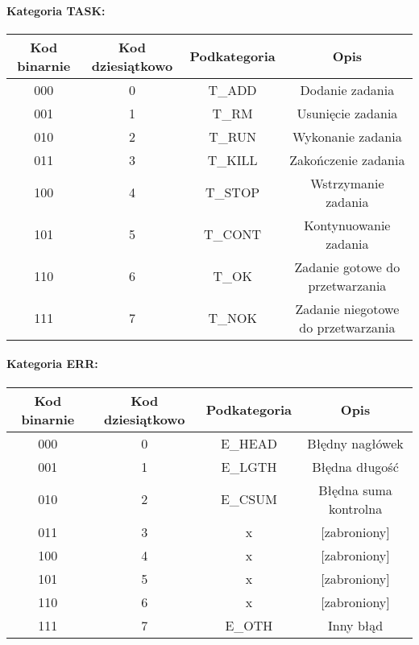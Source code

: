 \documentclass[10pt,a4paper]{article}
\begin{document}
			    \paragraph{Kategoria TASK:\\}
			    
		        \begin{tabular}{ c | c | c | c }
				    \textbf{Kod binarnie} & \textbf{Kod dziesiątkowo} & \textbf{Podkategoria} & \textbf{Opis} \\
				    \hline
				    000 & 0 & T\_ADD & Dodanie zadania \\
				    001 & 1 & T\_RM & Usunięcie zadania \\
				    010 & 2 & T\_RUN & Wykonanie zadania \\
				    011 & 3 & T\_KILL & Zakończenie zadania \\
				    100 & 4 & T\_STOP & Wstrzymanie zadania \\
				    101 & 5 & T\_CONT & Kontynuowanie zadania \\
				    110 & 6 & T\_OK & Zadanie gotowe do przetwarzania \\
				    111 & 7 & T\_NOK & Zadanie niegotowe do przetwarzania \\
				\end{tabular}
				
	
			    \paragraph{Kategoria ERR:\\}
			    
		        \begin{tabular}{ c | c | c | c }
				    \textbf{Kod binarnie} & \textbf{Kod dziesiątkowo} & \textbf{Podkategoria} & \textbf{Opis} \\
				    \hline
				    000 & 0 & E\_HEAD & Błędny nagłówek \\
				    001 & 1 & E\_LGTH & Błędna długość \\
				    010 & 2 & E\_CSUM & Błędna suma kontrolna \\
				    011 & 3 & x & [zabroniony] \\
				    100 & 4 & x & [zabroniony] \\
				    101 & 5 & x & [zabroniony] \\
				    110 & 6 & x & [zabroniony] \\
				    111 & 7 & E\_OTH & Inny błąd \\
				\end{tabular}
				
\end{document}
